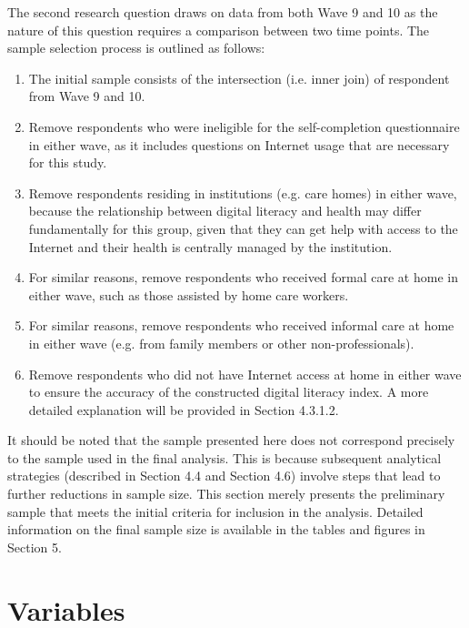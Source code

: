 The second research question draws on data from both Wave 9 and 10 as the nature of this question requires a comparison between two time points. The sample selection process is outlined as follows:

\begin{enumerate}
    \item The initial sample consists of the intersection (i.e. inner join) of respondent from Wave 9 and 10.
    \item Remove respondents who were ineligible for the self-completion questionnaire in either wave, as it includes questions on Internet usage that are necessary for this study.
    \item Remove respondents residing in institutions (e.g. care homes) in either wave, because the relationship between digital literacy and health may differ fundamentally for this group, given that they can get help with access to the Internet and their health is centrally managed by the institution.
    \item For similar reasons, remove respondents who received formal care at home in either wave, such as those assisted by home care workers.
    \item For similar reasons, remove respondents who received informal care at home in either wave (e.g. from family members or other non-professionals).
    \item Remove respondents who did not have Internet access at home in either wave to ensure the accuracy of the constructed digital literacy index. A more detailed explanation will be provided in Section 4.3.1.2.
\end{enumerate}

It should be noted that the sample presented here does not correspond precisely to the sample used in the final analysis. This is because subsequent analytical strategies (described in Section 4.4 and Section 4.6) involve steps that lead to further reductions in sample size. This section merely presents the preliminary sample that meets the initial criteria for inclusion in the analysis. Detailed information on the final sample size is available in the tables and figures in Section 5.

\section{Variables}

